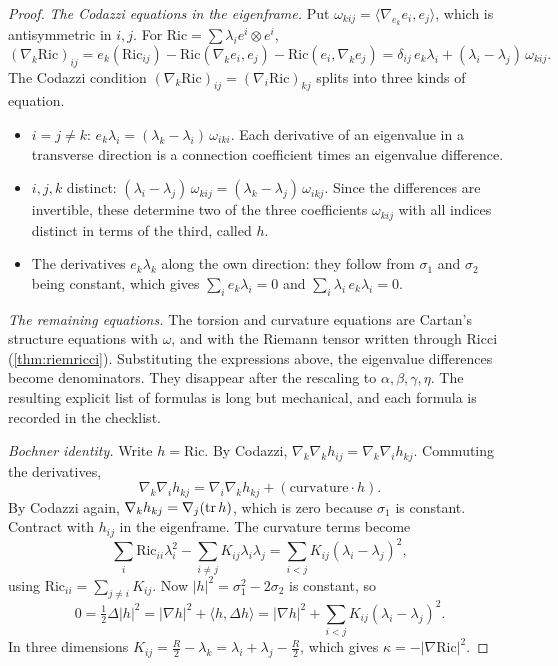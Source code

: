 \begin{proof}
\emph{The Codazzi equations in the eigenframe.} Put $\omega_{kij}=\langle\nabla_{e_k}e_i,e_j\rangle$, which is antisymmetric in $i,j$. For $\mathrm{Ric}=\sum\lambda_ie^i\otimes e^i$,
\[
(\nabla_k\mathrm{Ric})_{ij}=e_k(\mathrm{Ric}_{ij})-\mathrm{Ric}(\nabla_ke_i,e_j)-\mathrm{Ric}(e_i,\nabla_ke_j)=\delta_{ij}\,e_k\lambda_i+(\lambda_i-\lambda_j)\,\omega_{kij}.
\]
The Codazzi condition $(\nabla_k\mathrm{Ric})_{ij}=(\nabla_i\mathrm{Ric})_{kj}$ splits into three kinds of equation.
\begin{itemize}
\item $i=j\ne k$: $e_k\lambda_i=(\lambda_k-\lambda_i)\,\omega_{iki}$. Each derivative of an eigenvalue in a transverse direction is a connection coefficient times an eigenvalue difference.
\item $i,j,k$ distinct: $(\lambda_i-\lambda_j)\,\omega_{kij}=(\lambda_k-\lambda_j)\,\omega_{ikj}$. Since the differences are invertible, these determine two of the three coefficients $\omega_{kij}$ with all indices distinct in terms of the third, called $h$.
\item The derivatives $e_k\lambda_k$ along the own direction: they follow from $\sigma_1$ and $\sigma_2$ being constant, which gives $\sum_ie_k\lambda_i=0$ and $\sum_i\lambda_i\,e_k\lambda_i=0$.
\end{itemize}

\emph{The remaining equations.} The torsion and curvature equations are Cartan's structure equations with $\omega$, and with the Riemann tensor written through Ricci (\cref{thm:riemricci}). Substituting the expressions above, the eigenvalue differences become denominators. They disappear after the rescaling to $\alpha,\beta,\gamma,\eta$. The resulting explicit list of formulas is long but mechanical, and each formula is recorded in the checklist.

\emph{Bochner identity.} Write $h=\mathrm{Ric}$. By Codazzi, $\nabla_k\nabla_kh_{ij}=\nabla_k\nabla_ih_{kj}$. Commuting the derivatives,
\[
\nabla_k\nabla_ih_{kj}=\nabla_i\nabla_kh_{kj}+(\text{curvature}\cdot h).
\]
By Codazzi again, $\nabla_kh_{kj}=\nabla_j(\operatorname{tr} h)$, which is zero because $\sigma_1$ is constant. Contract with $h_{ij}$ in the eigenframe. The curvature terms become
\[
\sum_i\mathrm{Ric}_{ii}\lambda_i^2-\sum_{i\ne j}K_{ij}\lambda_i\lambda_j=\sum_{i<j}K_{ij}(\lambda_i-\lambda_j)^2 ,
\]
using $\mathrm{Ric}_{ii}=\sum_{j\ne i}K_{ij}$. Now $|h|^2=\sigma_1^2-2\sigma_2$ is constant, so
\[
0=\tfrac12\Delta|h|^2=|\nabla h|^2+\langle h,\Delta h\rangle=|\nabla h|^2+\sum_{i<j}K_{ij}(\lambda_i-\lambda_j)^2 .
\]
In three dimensions $K_{ij}=\frac R2-\lambda_k=\lambda_i+\lambda_j-\frac R2$, which gives $\kappa=-|\nabla\mathrm{Ric}|^2$.
\end{proof}


